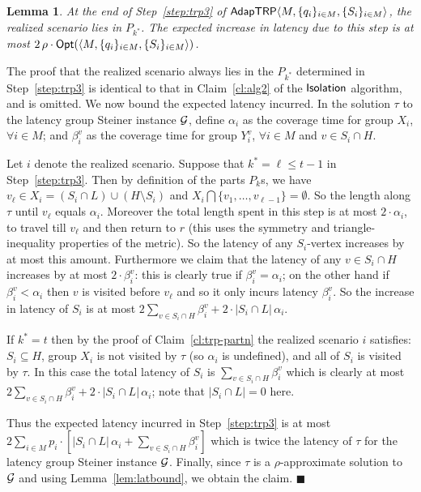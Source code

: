 \documentclass[11pt]{article}
\newtheorem{lemma}[thm]{Lemma}
\def\sse{\subseteq}
\def\opt{{\sf Opt}\xspace}
\def\isoprob{\ensuremath{{\sf Isolation}}\xspace}
\def\strp{\ensuremath{{\sf AdapTRP}}\xspace}
\newenvironment{pf}{

\noindent{\bf Proof:}} {\hfill$\blacksquare$


}
\begin{document}
\begin{lemma}\label{lem:alg3}
  At the end of Step~\ref{step:trp3} of $\strp\langle M, \{q_i\}_{i\in
    M}, \{S_i\}_{i\in  M}\rangle$, the realized scenario lies in $P_{k^*}$. 
    The expected increase in latency due to  this step is at most $2\,\rho \cdot \opt(\langle M, \{q_i\}_{i\in M}, \{S_i\}_{i\in M}\rangle)$.
\end{lemma}
\begin{pf}
The proof that the realized scenario always lies in the $P_{k^*}$ determined in Step~\ref{step:trp3} is identical to that
in Claim~\ref{cl:alg2} of the \isoprob algorithm, and is omitted. We now bound the expected latency incurred. In the solution  $\tau$
to the latency group Steiner instance ${\cal G}$, define $\alpha_i$ as the coverage time for group $X_i$, $\forall i\in
M$; and $\beta_i^v$ as the coverage time for group $Y_i^v$, $\forall i\in M$ and $v\in S_i\cap H$.

Let $i$ denote the realized scenario. Suppose that $k^*=\ell\le t-1$ in Step~\ref{step:trp3}. Then by definition of the
parts $P_k$s, we have $v_{\ell}\in X_{i} = (S_i  \cap L) \cup (H \setminus S_i)$ and $X_i\bigcap
\{v_1,\ldots,v_{\ell-1}\}=\emptyset$. So the length along $\tau$ until $v_\ell$ equals $\alpha_i$. Moreover the total
length spent in this step is at most $2\cdot \alpha_i$, to travel till $v_\ell$ and then return to $r$ (this uses the symmetry and triangle-inequality properties of the metric). So the latency
of any $S_i$-vertex increases by at most this amount. Furthermore we claim that the latency of any $v\in S_i\cap H$ increases by
at most $2\cdot \beta_i^v$: this is clearly true if $\beta_i^v=\alpha_i$; on the other hand if $\beta_i^v<\alpha_i$
then $v$ is visited before $v_\ell$ and so it only incurs latency $\beta_i^v$. So the increase in latency of $S_i$ is
at most $2\sum_{v\in S_i\cap H} \beta_i^v + 2\cdot |S_i\cap L|\,\alpha_i$.

If $k^*=t$ then by the proof of Claim~\ref{cl:trp-partn} the realized scenario $i$ satisfies: $S_i\sse H$, group $X_i$ is not visited by $\tau$ (so $\alpha_i$ is undefined), and all of $S_i$ is visited by $\tau$. In this case the total
latency of $S_i$ is $\sum_{v\in S_i\cap H} \beta_i^v$ which is clearly at most $2\sum_{v\in S_i\cap H} \beta_i^v +
2\cdot |S_i\cap L|\,\alpha_i$; note that $|S_i\cap L|=0$ here.

Thus the expected latency incurred in Step~\ref{step:trp3} is at most $2 \sum_{i\in  M} p_i \cdot \left[ |S_i\cap
L|\,\alpha_i + \sum_{v\in S_i\cap H} \beta_i^v \right]$ which is twice the latency of $\tau$ for the latency group
Steiner instance ${\cal G}$. Finally, since $\tau$ is a $\rho$-approximate solution to ${\cal G}$ and using
Lemma~\ref{lem:latbound}, we obtain the claim.
\end{pf}
\end{document}
